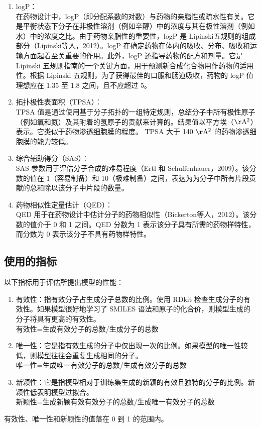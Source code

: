 \begin{translation}
\begin{enumerate}[label=\alph*)]
  \item logP： \\在药物设计中，logP（即分配系数的对数）与药物的亲脂性或疏水性有关。它是平衡状态下分子在非极性溶剂（例如辛醇）中的浓度与其在极性溶剂（例如水）中的浓度之比。由于药物亲脂性的重要性，logP 是 Lipinski五规则的组成部分（Lipinski等人，2012）。logP 在确定药物在体内的吸收、分布、吸收和运输方面起着至关重要的作用。此外，logP 还指导药物的配方和剂量。它是 Lipinski 五规则指南的一个关键方面，用于预测新合成化合物用作药物的适用性。根据 Lipinski 五规则，为了获得最佳的口服和肠道吸收，药物的 logP 值理想应在 1.35 至 1.8 之间，且不应超过 5。
  \item 拓扑极性表面积（TPSA）：\\TPSA 值是通过使用基于分子拓扑的一组特定规则，总结分子中所有极性原子（例如氧和氮）及其附着的氢原子的贡献来计算的。结果值以平方埃（$\rm Å^2$）表示。它类似于药物渗透细胞膜的程度。 TPSA 大于 140 $\rm Å^2$ 的药物渗透细胞膜的能力较低。
  \item 综合辅助得分（SAS）：\\SAS 参数用于评估分子合成的难易程度（Ertl 和 Schuffenhauer，2009）。该分数的值在 1（容易制备）和 10（极难制备）之间，表达为为分子中所有片段贡献的总和除以该分子中片段的数量。
  \item 药物相似性定量估计（QED）：\\QED 用于在药物设计中估计分子的药物相似性（Bickerton等人，2012）。该分数的值介于 0 和 1 之间。QED 分数为 1 表示该分子具有所需的药物样特性，而分数为 0 表示该分子不具有药物样特性。
\end{enumerate}

\subsection{使用的指标}

以下指标用于评估所提出模型的性能：


\begin{enumerate}[label=\alph*)]
  \item 有效性：指有效分子占生成分子总数的比例。使用 RDkit 检查生成分子的有效性。如果模型很好地学习了 SMILES 语法和原子的化合价，则模型生成的分子将具有更高的有效性。\\有效性=生成有效分子的总数/生成分子的总数
  \item 唯一性：它是指有效生成的分子中仅出现一次的比例。如果模型的唯一性较低，则模型往往会重复生成相同的分子。\\唯一性=生成唯一有效分子的总数/生成有效分子的总数
  \item 新颖性：它是指模型相对于训练集生成的新颖的有效且独特的分子的比例。新颖性低表明模型过拟合。\\新颖性=生成新颖有效有效分子的总数/生成唯一有效分子的总数
\end{enumerate}
有效性、唯一性和新颖性的值落在 0 到 1 的范围内。


\end{translation}
